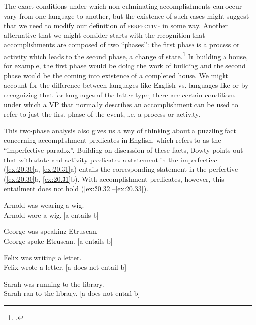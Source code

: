 The exact conditions under which non-culminating accomplishments can occur vary from one language to another, but the existence of such cases might suggest that we need to modify our definition of \textsc{perfective} in some way. Another alternative that we might consider starts with the recognition that accomplishments are composed of two “phases”: the first phase is a process or activity which leads to the second phase, a change of state.\footnote{\citet{KleinEtAl2000}.} In building a house, for example, the first phase would be doing the work of building and the second phase would be the coming into existence of a completed house. We might account for the difference between languages like English vs. languages like  or  by recognizing that for languages of the latter type, there are certain conditions under which a VP that normally describes an accomplishment can be used to refer to just the first phase of the event, i.e. a process or activity.



This two-phase analysis also gives us a way of thinking about a puzzling fact concerning accomplishment predicates in English, which \citet{Dowty1979} refers to as the “imperfective paradox”. Building on  discussion of these facts, Dowty points out that with state and activity predicates a statement in the imperfective (\ref{ex:20.30}a, \ref{ex:20.31}a) entails the corresponding statement in the perfective (\ref{ex:20.30}b, \ref{ex:20.31}b). With accomplishment predicates, however, this entailment does not hold (\ref{ex:20.32}--\ref{ex:20.33}).


\ea \label{ex:20.30}
\ea  Arnold was wearing a wig.\\
\ex Arnold wore a wig. \hfill [a entails b]
                       \z
\z

\ea \label{ex:20.31}
\ea  George was speaking {Etruscan}.\\
\ex George spoke {Etruscan}. \hfill [a entails b]
                       \z
\z

\ea \label{ex:20.32}
\ea  Felix was writing a letter.\\
\ex Felix wrote a letter. \hfill [a does not entail b]
                       \z
\z


\ea \label{ex:20.33}
\ea  Sarah was running to the library.\\
\ex Sarah ran to the library. \hfill [a does not entail b]
                       \z
\z

